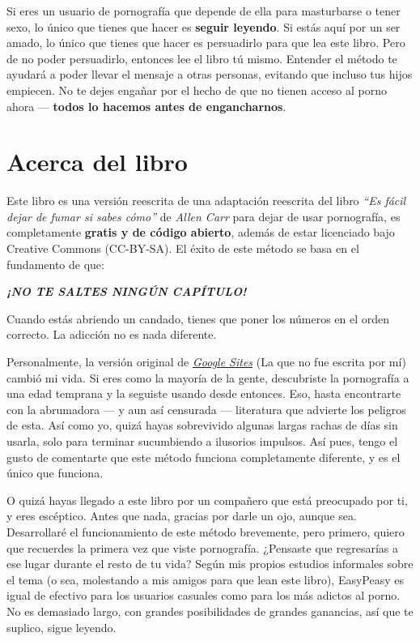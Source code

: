 \documentclass[
  spanish,
  openany]{book}
\let\oldhref\href
\renewcommand{\href}[2]{\textcolor{linkcolor}{\oldhref{#1}{#2}}}
\begin{document}
Si eres un usuario de pornografía que depende de ella para masturbarse o tener sexo, lo único que tienes que hacer es \textbf{seguir leyendo}. Si estás aquí por un ser amado, lo único que tienes que hacer es persuadirlo para que lea este libro. Pero de no poder persuadirlo, entonces lee el libro tú mismo. Entender el método te ayudará a poder llevar el mensaje a otras personas, evitando que incluso tus hijos empiecen. No te dejes engañar por el hecho de que no tienen acceso al porno ahora --- \textbf{todos lo hacemos antes de engancharnos}.

\hypertarget{acerca-del-libro}{%
\section*{Acerca del libro}\label{acerca-del-libro}}

Este libro es una versión reescrita de una adaptación reescrita del libro \emph{``Es fácil dejar de fumar si sabes cómo''} de \emph{Allen Carr} para dejar de usar pornografía, es completamente \textbf{gratis y de código abierto}, además de estar licenciado bajo Creative Commons (CC-BY-SA). El éxito de este método se basa en el fundamento de que:

{\emph{\textbf{¡NO TE SALTES NINGÚN CAPÍTULO!}}}

Cuando estás abriendo un candado, tienes que poner los números en el orden correcto. La adicción no es nada diferente.

Personalmente, la versión original de \href{https://sites.google.com/site/sites/system/errors/WebspaceNotFound?path=\%2Fhackbookeasypeasy}{\emph{Google Sites}} (La que no fue escrita por mí) cambió mi vida. Si eres como la mayoría de la gente, descubriste la pornografía a una edad temprana y la seguiste usando desde entonces. Eso, hasta encontrarte con la abrumadora --- y aun así censurada --- literatura que advierte los peligros de esta. Así como yo, quizá hayas sobrevivido algunas largas rachas de días sin usarla, solo para terminar sucumbiendo a ilusorios impulsos. Así pues, tengo el gusto de comentarte que este método funciona completamente diferente, y es el único que funciona.

O quizá hayas llegado a este libro por un compañero que está preocupado por ti, y eres escéptico. Antes que nada, gracias por darle un ojo, aunque sea. Desarrollaré el funcionamiento de este método brevemente, pero primero, quiero que recuerdes la primera vez que viste pornografía. ¿Pensaste que regresarías a ese lugar durante el resto de tu vida? Según mis propios estudios informales sobre el tema (o sea, molestando a mis amigos para que lean este libro), EasyPeasy es igual de efectivo para los usuarios casuales como para los más adictos al porno. No es demasiado largo, con grandes posibilidades de grandes ganancias, así que te suplico, sigue leyendo.
\end{document}
